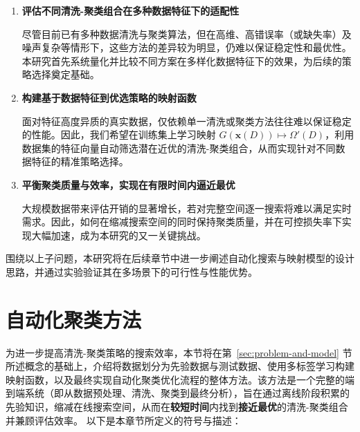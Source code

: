 \documentclass[10pt]{article} %
\numberwithin{equation}{section}
\begin{document}
\begin{enumerate}[label=\textbf{\((Q_{\arabic*})\)},leftmargin=25pt]
    \item \textbf{评估不同清洗-聚类组合在多种数据特征下的适配性}  

    尽管目前已有多种数据清洗与聚类算法，但在高维、高错误率（或缺失率）及噪声复杂等情形下，这些方法的差异较为明显，仍难以保证稳定性和最优性。本研究首先系统量化并比较不同方案在多样化数据特征下的效果，为后续的策略选择奠定基础。

    \item \textbf{构建基于数据特征到优选策略的映射函数}  

    面对特征高度异质的真实数据，仅依赖单一清洗或聚类方法往往难以保证稳定的性能。因此，我们希望在训练集上学习映射 \(G(\mathbf{x}(D)) \mapsto \Omega'(D)\)，利用数据集的特征向量自动筛选潜在近优的清洗-聚类组合，从而实现针对不同数据特征的精准策略选择。

    \item \textbf{平衡聚类质量与效率，实现在有限时间内逼近最优}  

    大规模数据带来评估开销的显著增长，若对完整空间逐一搜索将难以满足实时需求。因此，如何在缩减搜索空间的同时保持聚类质量，并在可控损失率下实现大幅加速，成为本研究的又一关键挑战。
\end{enumerate}

围绕以上子问题，本研究将在后续章节中进一步阐述自动化搜索与映射模型的设计思路，并通过实验验证其在多场景下的可行性与性能优势。


\section{自动化聚类方法}
\label{sec:autoML}

为进一步提高清洗-聚类策略的搜索效率，本节将在第~\ref{sec:problem-and-model} 节所述概念的基础上，介绍将数据划分为先验数据与测试数据、使用多标签学习构建映射函数，以及最终实现自动化聚类优化流程的整体方法。该方法是一个完整的端到端系统（即从数据预处理、清洗、聚类到最终分析），旨在通过离线阶段积累的先验知识，缩减在线搜索空间，从而在\textbf{较短时间}内找到\textbf{接近最优}的清洗-聚类组合并兼顾评估效率。
以下是本章节所定义的符号与描述：
\end{document}
